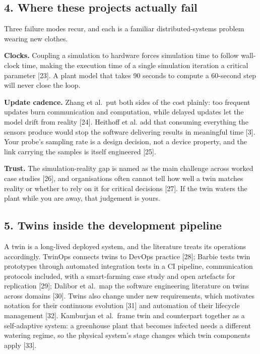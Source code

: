\documentclass[
  12pt,
  a4paper,
]{article}
\begin{document}
\subsection{4. Where these projects actually
fail}\label{where-these-projects-actually-fail}

Three failure modes recur, and each is a familiar distributed-systems
problem wearing new clothes.

\textbf{Clocks.} Coupling a simulation to hardware forces simulation
time to follow wall-clock time, making the execution time of a single
simulation iteration a critical parameter {[}23{]}. A plant model that
takes 90 seconds to compute a 60-second step will never close the loop.

\textbf{Update cadence.} Zhang et al.~put both sides of the cost
plainly: too frequent updates burn communication and computation, while
delayed updates let the model drift from reality {[}24{]}. Heithoff et
al. add that consuming everything the sensors produce would stop the
software delivering results in meaningful time {[}3{]}. Your probe's
sampling rate is a design decision, not a device property, and the link
carrying the samples is itself engineered {[}25{]}.

\textbf{Trust.} The simulation-reality gap is named as the main
challenge across worked case studies {[}26{]}, and organisations often
cannot tell how well a twin matches reality or whether to rely on it for
critical decisions {[}27{]}. If the twin waters the plant while you are
away, that judgement is yours.

\subsection{5. Twins inside the development
pipeline}\label{twins-inside-the-development-pipeline}

A twin is a long-lived deployed system, and the literature treats its
operations accordingly. TwinOps connects twins to DevOps practice
{[}28{]}; Barbie tests twin prototypes through automated integration
tests in a CI pipeline, communication protocols included, with a
smart-farming case study and open artefacts for replication {[}29{]};
Dalibor et al.~map the software engineering literature on twins across
domains {[}30{]}. Twins also change under new requirements, which
motivates notation for their continuous evolution {[}31{]} and
automation of their lifecycle management {[}32{]}. Kamburjan et
al.~frame twin and counterpart together as a self-adaptive system: a
greenhouse plant that becomes infected needs a different watering
regime, so the physical system's stage changes which twin components
apply {[}33{]}.
\end{document}
